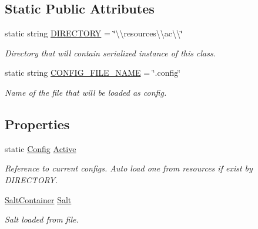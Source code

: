 \subsection*{Static Public Attributes}
\begin{DoxyCompactItemize}
\item 
static string \mbox{\hyperlink{class_authority_controller_1_1_data_1_1_config_a498509c50902acb12629f1f4110879cc}{D\+I\+R\+E\+C\+T\+O\+RY}} = \char`\"{}\textbackslash{}\textbackslash{}resources\textbackslash{}\textbackslash{}ac\textbackslash{}\textbackslash{}\char`\"{}
\begin{DoxyCompactList}\small\item\em Directory that will contain serialized instance of this class. \end{DoxyCompactList}\item 
static string \mbox{\hyperlink{class_authority_controller_1_1_data_1_1_config_adca90088250467f620512b7ac5ef028f}{C\+O\+N\+F\+I\+G\+\_\+\+F\+I\+L\+E\+\_\+\+N\+A\+ME}} = \char`\"{}.config\char`\"{}
\begin{DoxyCompactList}\small\item\em Name of the file that will be loaded as config. \end{DoxyCompactList}\end{DoxyCompactItemize}
\subsection*{Properties}
\begin{DoxyCompactItemize}
\item 
static \mbox{\hyperlink{class_authority_controller_1_1_data_1_1_config}{Config}} \mbox{\hyperlink{class_authority_controller_1_1_data_1_1_config_a0cf8083d60c0876a83ecb79e32fc9ffc}{Active}}
\begin{DoxyCompactList}\small\item\em Reference to current configs. Auto load one from resources if exist by D\+I\+R\+E\+C\+T\+O\+RY. \end{DoxyCompactList}\item 
\mbox{\hyperlink{class_authority_controller_1_1_data_1_1_salt_container}{Salt\+Container}} \mbox{\hyperlink{class_authority_controller_1_1_data_1_1_config_ad40500f15f27c829f86295c7cd40d68c}{Salt}}
\begin{DoxyCompactList}\small\item\em Salt loaded from file. \end{DoxyCompactList}\end{DoxyCompactItemize}

